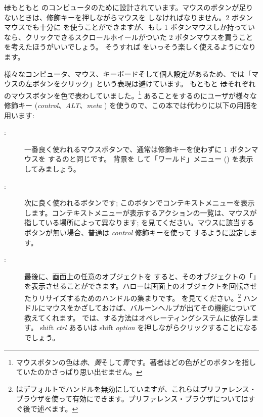 \documentclass[a4paper,10pt,twoside]{book}
\begin{document}
\st はもともと のコンピュータのために設計されています。マウスのボタンが足りないときは、修飾キーを押しながらマウスを \click しなければなりません。2 ボタンマウスでも十分に \pharo を使うことができますが、もし 1 ボタンマウスしか持っていなら、クリックできるスクロールホイールがついた 2 ボタンマウスを買うことを考えたほうがいいでしょう。 そうすれば \pharo をいっそう楽しく使えるようになります。

様々なコンピュータ、マウス、キーボードそして個人設定があるため、\pharo では「マウスの左ボタンをクリック」という表現は避けています。
もともと \st はそれぞれのマウスボタンを色で表わしていました。\footnote{マウスボタンの色は\emph{赤}、\emph{黄}そして\emph{青}です。著者はどの色がどのボタンを指していたのかさっぱり思い出せません。}
あることをするのにユーザが様々な修飾キー (\emph{control}、\emph{ALT}、\emph{meta} \etc) を使うので、この本では代わりに以下の用語を用います:
\begin{description}
\item [\click:] 一番良く使われるマウスボタンで、通常は修飾キーを使わずに 1 ボタンマウスを \click するのと同じです。 背景を \click して「ワールド」メニュー () を表示してみましょう。
\item [\actclick:] 次に良く使われるボタンです; このボタンでコンテキストメニューを表示します。コンテキストメニューが表示するアクションの一覧は、マウスが指している場所によって異なります;  を見てください。マウスに該当するボタンが無い場合、普通は \emph{control} 修飾キーを使って \actclick するように設定します。
\item [\metaclick:] 最後に、画面上の任意のオブジェクトを \metaclick すると、そのオブジェクトの「」を表示させることができます。ハローは画面上のオブジェクトを回転させたりリサイズするためのハンドルの集まりです。  を見てください。\footnote{\pharo はデフォルトでハンドルを無効にしていますが、これらはプリファレンス・ブラウザを使って有効にできます。プリファレンス・ブラウザについてはすぐ後で述べます。}
ハンドルにマウスをかざしておけば、バルーンヘルプが出てその機能について教えてくれます。
\pharo では、\metaclick する方法はオペレーティングシステムに依存します。
{\sc shift} \emph{ctrl} あるいは {\sc shift} \emph{option} を押しながらクリックすることになるでしょう。
\end{description}
\end{document}

